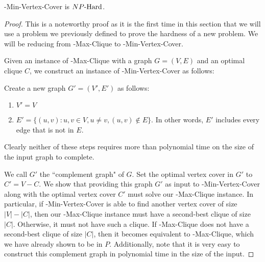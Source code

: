 \begin{theorem}
\inob{}-Min-Vertex-Cover is ${NP\text{-Hard{}}}$.
\end{theorem}
\begin{proof}
This is a noteworthy proof as it is the first time in this section that we will use a problem we previously defined to prove the hardness of a new problem. We will be reducing from \inob{}-Max-Clique to \inob{}-Min-Vertex-Cover.

Given an instance of \inob{}-Max-Clique with a graph $G = (V, E)$ and an optimal clique $C$, we construct an instance of \inob{}-Min-Vertex-Cover as follows:

Create a new graph $G' = (V', E')$ as follows:
\begin{enumerate}
    \item $V' = V$ 
    \item $E' = \{(u, v) : u, v \in V, u \neq v, (u, v) \notin E\}$. In other words, $E'$ includes every edge that is not in $E$.
\end{enumerate}
Clearly neither of these steps requires more than polynomial time on the size of the input graph to complete.

We call $G'$ the ``complement graph" of $G$.
Set the optimal vertex cover in $G'$ to $C' = V - C$.
We show that providing this graph $G'$ as input to \inob{}-Min-Vertex-Cover along with the optimal vertex cover $C'$ must solve our \inob{}-Max-Clique instance. In particular, if \inob{}-Min-Vertex-Cover is able to find another vertex cover of size $|V| - |C|$, then our \inob{}-Max-Clique instance must have a second-best clique of size $|C|$. Otherwise, it must not have such a clique. If \inob{}-Max-Clique does not have a second-best clique of size $|C|$, then it becomes equivalent to \exob{}-Max-Clique, which we have already shown to be in $P$. Additionally, note that it is very easy to construct this complement graph in polynomial time in the size of the input.


\end{proof}
